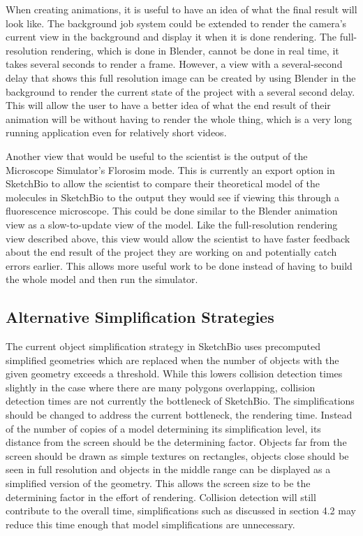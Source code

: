 \documentclass{article} %
\begin{document}
When creating animations, it is useful to have an idea of what the final result will look like.  The background job system could be extended to render the camera’s current view in the background and display it when it is done rendering.  The full-resolution rendering, which is done in Blender, cannot be done in real time, it takes several seconds to render a frame.  However, a view with a several-second delay that shows this full resolution image can be created by using Blender in the background to render the current state of the project with a several second delay.  This will allow the user to have a better idea of what the end result of their animation will be without having to render the whole thing, which is a very long running application even for relatively short videos.

Another view that would be useful to the scientist is the output of the Microscope Simulator’s Florosim mode.  This is currently an export option in SketchBio to allow the scientist to compare their theoretical model of the molecules in SketchBio to the output they would see if viewing this through a fluorescence microscope.  This could be done similar to the Blender animation view as a slow-to-update view of the model.  Like the full-resolution rendering view described above, this view would allow the scientist to have faster feedback about the end result of the project they are working on and potentially catch errors earlier.  This allows more useful work to be done instead of having to build the whole model and then run the simulator.

\subsection{Alternative Simplification Strategies}
\label{sec:simplification_strategies}
The current object simplification strategy in SketchBio uses precomputed simplified geometries which are replaced when the number of objects with the given geometry exceeds a threshold.  While this lowers collision detection times slightly in the case where there are many polygons overlapping, collision detection times are not currently the bottleneck of SketchBio.  The simplifications should be changed to address the current bottleneck, the rendering time.  Instead of the number of copies of a model determining its simplification level, its distance from the screen should be the determining factor.  Objects far from the screen should be drawn as simple textures on rectangles, objects close should be seen in full resolution and objects in the middle range can be displayed as a simplified version of the geometry.  This allows the screen size to be the determining factor in the effort of rendering.  Collision detection will still contribute to the overall time, simplifications such as discussed in section 4.2 may reduce this time enough that model simplifications are unnecessary.
\end{document}
